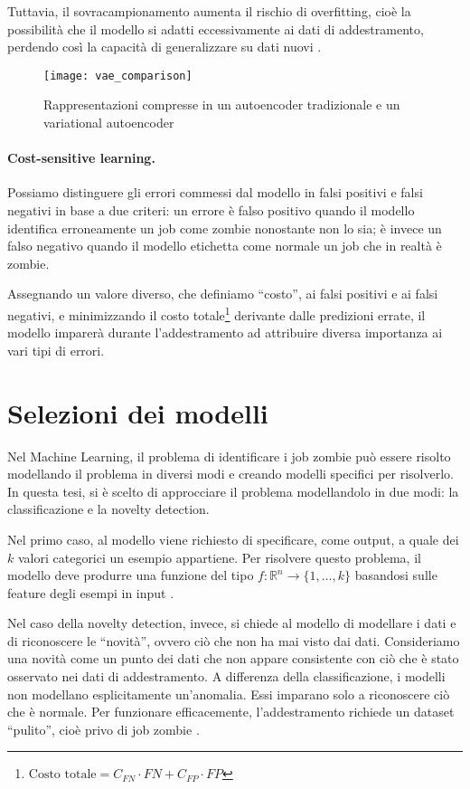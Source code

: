Tuttavia, il sovracampionamento aumenta il rischio di overfitting, cioè la
possibilità che il modello si adatti eccessivamente ai dati di addestramento,
perdendo così la capacità di generalizzare su dati nuovi \cite{fernandez2018}.

\begin{figure}
    \centering
    \texttt{[image: vae\_comparison]}
    \caption{Rappresentazioni compresse in un autoencoder tradizionale e un
    variational autoencoder \cite{shafkat2018}}
    \label{fig:vae_comparison}
\end{figure}

\paragraph{Cost-sensitive learning.}

Possiamo distinguere gli errori commessi dal modello in falsi positivi e falsi
negativi in base a due criteri: un errore è falso positivo quando il modello
identifica erroneamente un job come zombie nonostante non lo sia; è invece un
falso negativo quando il modello etichetta come normale un job che in realtà è
zombie.

Assegnando un valore diverso, che definiamo ``costo'', ai falsi positivi e ai
falsi negativi, e minimizzando il costo totale\footnote{$\text{Costo totale} =
    C_{FN} \cdot
FN + C_{FP} \cdot FP$} derivante dalle predizioni
errate, il modello imparerà durante l'addestramento ad attribuire diversa
importanza ai vari tipi di errori.

\section{Selezioni dei modelli}

Nel Machine Learning, il problema di identificare i job zombie può essere
risolto modellando il problema in diversi modi e creando modelli specifici per
risolverlo. In questa tesi, si è scelto di approcciare il problema
modellandolo in due modi: la classificazione e la novelty detection.

Nel primo caso, al modello viene richiesto di specificare, come output, a
quale dei $k$ valori categorici un esempio appartiene. Per risolvere questo
problema, il modello deve produrre una funzione del tipo
$f:\mathbb{R}^n\to\{1,\ldots,k\}$ basandosi sulle feature degli esempi in
input \cite{Goodfellow2016}.

Nel caso della novelty detection, invece, si chiede al modello di modellare i
dati e di riconoscere le ``novità'', ovvero ciò che non ha mai visto dai dati.
Consideriamo una novità come un punto dei dati che non appare consistente con
ciò che è stato osservato nei dati di addestramento. A differenza della
classificazione, i  modelli non modellano esplicitamente un'anomalia. Essi
imparano solo a riconoscere ciò che è normale. Per funzionare efficacemente,
l'addestramento richiede un dataset ``pulito'', cioè privo di job zombie
\cite{geron2019, pimentel2014}.

